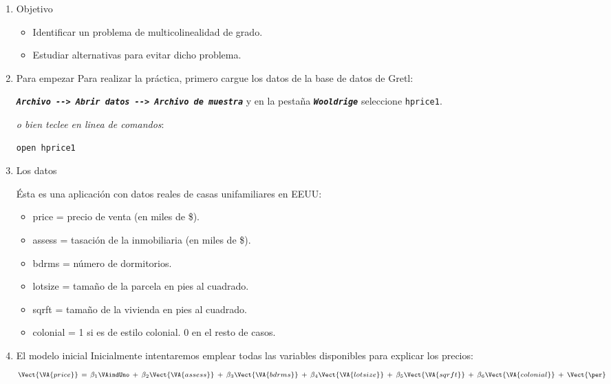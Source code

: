 \documentclass[11pt]{article}
\begin{document}
\begin{enumerate}
\item Objetivo
\label{sec:org8745994}
\begin{itemize}
\item Identificar un problema de multicolinealidad de grado.
\item Estudiar alternativas para evitar dicho problema.
\end{itemize}

\item Para empezar
\label{sec:orgf0199f2}
Para realizar la práctica, primero cargue los datos de la base de
datos de Gretl:

\textbf{\emph{\texttt{Archivo -{}-> Abrir datos -{}-> Archivo de muestra}}} y en la pestaña
\textbf{\emph{\texttt{Wooldrige}}} seleccione \texttt{hprice1}.

{\vspace{0pt} \color{gray!70!black}
\emph{o bien teclee en linea de comandos}:
\begin{verbatim}
open hprice1
\end{verbatim}
}

\item Los datos
\label{sec:org4ee2144}

Ésta es una aplicación con datos reales de casas unifamiliares en EEUU:
\begin{itemize}
\item \textsf{price}  = precio de venta (en miles de \$).
\item \textsf{assess} = tasación de la inmobiliaria (en miles de \$).
\item \textsf{bdrms}  = número de dormitorios.
\item \textsf{lotsize} = tamaño de la parcela en pies al cuadrado.
\item \textsf{sqrft}  = tamaño de la vivienda en pies al cuadrado.
\item \textsf{colonial} = 1 si es de estilo colonial. 0 en el resto de casos.
\end{itemize}

\item El modelo inicial
\label{sec:orgddd968d}
Inicialmente intentaremos emplear todas las variables disponibles para
explicar los precios:
\begin{displaymath}
  \scriptstyle
  \Vect{\VA{price}}\ = \ \beta_1\VAindUno 
  \ +\ \beta_2\Vect{\VA{assess}}
  \ +\ \beta_3\Vect{\VA{bdrms}}
  \ +\ \beta_4\Vect{\VA{lotsize}}
  \ +\ \beta_5\Vect{\VA{sqrft}}
  \ +\ \beta_6\Vect{\VA{colonial}}
  \ +\ \Vect{\per}
\end{displaymath}
\end{enumerate}
\end{document}
